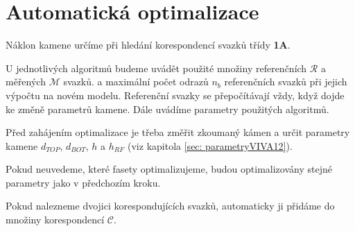 \newpage
\section{Automatická optimalizace}
\label{sec: auto}

Náklon kamene určíme při hledání korespondencí svazků třídy \textbf{1A}. 

U jednotlivých algoritmů budeme uvádět použité množiny referenčních $\mathcal{R}$ a měřených $\mathcal{M}$ svazků.  a maximální počet odrazů $n_b$ referenčních svazků při jejich výpočtu na novém modelu. Referenční svazky se přepočítávají vždy, když dojde ke změně parametrů kamene. Dále uvádíme parametry použitých algoritmů. 

Před zahájením optimalizace je třeba změřit zkoumaný kámen a určit parametry kamene $d_{TOP}$, $d_{BOT}$, $h$ a $h_{RF}$ (viz kapitola \ref{sec: parametryVIVA12}). 

Pokud neuvedeme, které fasety optimalizujeme, budou optimalizovány stejné parametry jako v předchozím kroku.

Pokud nalezneme dvojici korespondujících svazků, automaticky ji přidáme do množiny korespondencí $\mathcal{C}$.  

